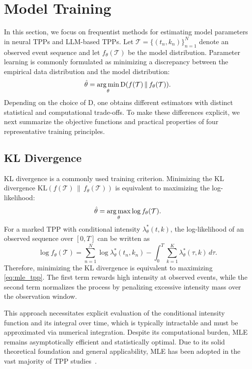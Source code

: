 \documentclass[10pt]{article} %
\begin{document}
\section{Model Training}

In this section, we focus on frequentist methods for estimating model parameters in neural TPPs and LLM-based TPPs. Let $\mathcal{T}=\{(t_n,k_n)\}_{n=1}^N$ denote an observed event sequence and let $f_\theta(\mathcal{T})$ be the model distribution. Parameter learning is commonly formulated as minimizing a discrepancy between the empirical data distribution and the model distribution:
\begin{equation}
    \hat{\theta} = \operatorname*{arg\,min}_\theta \mathrm{D}(f(\mathcal{T})\,\|\,f_\theta(\mathcal{T})).
\end{equation}
Depending on the choice of $\mathrm{D}$, one obtains different estimators with distinct statistical and computational trade-offs. To make these differences explicit, we next summarize the objective functions and practical properties of four representative training principles.




\subsection{KL Divergence}
\label{kl}
KL divergence is a commonly used training criterion. Minimizing the KL divergence \(\text{KL}(f(\mathcal{T}) \,\|\, f_\theta(\mathcal{T}))\) is equivalent to maximizing the log-likelihood: 
\[
\hat{\theta} = \operatorname*{arg\,max}_\theta \log f_\theta(\mathcal{T}).
\]
For a marked TPP with conditional intensity $\lambda_\theta^*(t,k)$, the log-likelihood of an observed sequence over $[0,T]$ can be written as
\begin{equation}
    \log f_\theta(\mathcal{T}) = \sum_{n=1}^{N} \log \lambda_\theta^*(t_n,k_n) - \int_0^T \sum_{k=1}^{K} \lambda_\theta^*(\tau,k)\, d\tau.
    \label{eq:mle_tpp}
\end{equation}
Therefore, minimizing the KL divergence is equivalent to maximizing \eqref{eq:mle_tpp}. The first term rewards high intensity at observed events, while the second term normalizes the process by penalizing excessive intensity mass over the observation window.

This approach necessitates explicit evaluation of the conditional intensity function and its integral over time, which is typically intractable and must be approximated via numerical integration. Despite its computational burden, MLE remains asymptotically efficient and statistically optimal. Due to its solid theoretical foundation and general applicability, MLE has been adopted in the vast majority of TPP studies~\citep{ozaki1979maximum,paninski2004maximum}. 
\end{document}
